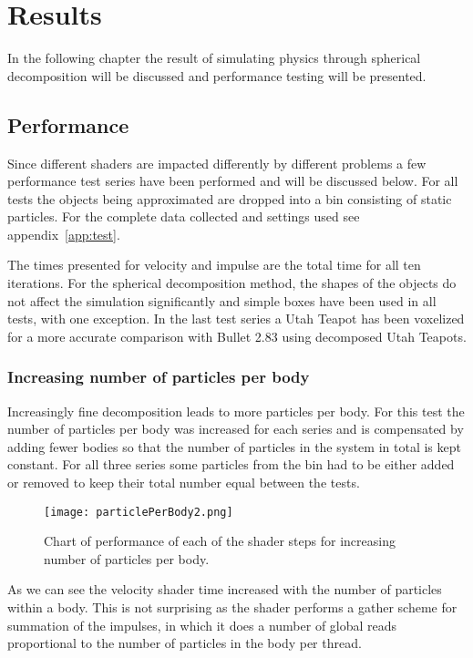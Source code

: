 \chapter{Results}
In the following chapter the result of simulating physics through spherical decomposition will
be discussed and performance testing will be presented.

\section{Performance}
Since different shaders are impacted differently by different problems a few performance
test series have been performed and will be discussed below.
For all tests the objects being approximated
are dropped into a bin consisting of static particles. For the complete data collected and
settings used see appendix~\ref{app:test}.

The times presented for velocity and impulse
are the total time for all ten iterations. For the spherical decomposition method, the shapes of the objects
 do not affect the simulation significantly and simple boxes have been used in all tests, with one exception.
 In the last test series a Utah Teapot has been voxelized for a more accurate
 comparison with Bullet 2.83 using decomposed Utah Teapots.

\subsection{Increasing number of particles per body}
Increasingly fine decomposition leads to more particles per body.
For this test the number of particles per body was increased for each series and is
compensated by adding fewer bodies so that the number of particles in the system
in total is kept constant. For all three series some particles from the bin had to be
either added or removed to keep their total number equal between the tests.
\begin{figure}[H]
  \centering
  \texttt{[image: particlePerBody2.png]}
  \caption{Chart of performance of each of the shader steps for increasing number of particles per body.}
  \label{fig:particlePerBody}
\end{figure}
As we can see the velocity shader time increased with the number of particles
within a body. This is not surprising as the shader performs a gather scheme for
summation of the impulses, in which it does a number of global reads proportional
to the number of particles in the body per thread.

